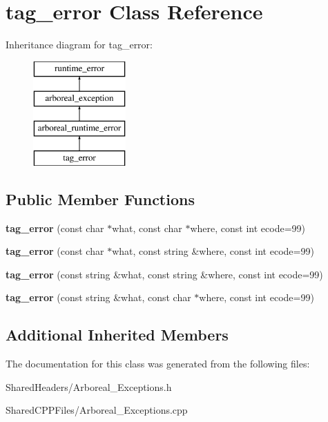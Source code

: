 \hypertarget{classtag__error}{}\section{tag\+\_\+error Class Reference}
\label{classtag__error}
Inheritance diagram for tag\+\_\+error\+:\begin{figure}[H]
\begin{center}
\leavevmode
\includegraphics[height=4.000000cm]{dd/df9/classtag__error}
\end{center}
\end{figure}
\subsection*{Public Member Functions}
\begin{DoxyCompactItemize}
\item 
\mbox{\label{classtag__error_a49b7eb59916bbc065f7d79bbf31cb460}} 
{\bfseries tag\+\_\+error} (const char $\ast$what, const char $\ast$where, const int ecode=99)
\item 
\mbox{\label{classtag__error_abc7794a3cf421776f77b781b4bef9dfb}} 
{\bfseries tag\+\_\+error} (const char $\ast$what, const string \&where, const int ecode=99)
\item 
\mbox{\label{classtag__error_afc103fa30ef508088c2cb4eda60837d2}} 
{\bfseries tag\+\_\+error} (const string \&what, const string \&where, const int ecode=99)
\item 
\mbox{\label{classtag__error_a70a4e7f9da04ca034f23e42ce1e95433}} 
{\bfseries tag\+\_\+error} (const string \&what, const char $\ast$where, const int ecode=99)
\end{DoxyCompactItemize}
\subsection*{Additional Inherited Members}


The documentation for this class was generated from the following files\+:\begin{DoxyCompactItemize}
\item 
Shared\+Headers/Arboreal\+\_\+\+Exceptions.\+h\item 
Shared\+C\+P\+P\+Files/Arboreal\+\_\+\+Exceptions.\+cpp\end{DoxyCompactItemize}
